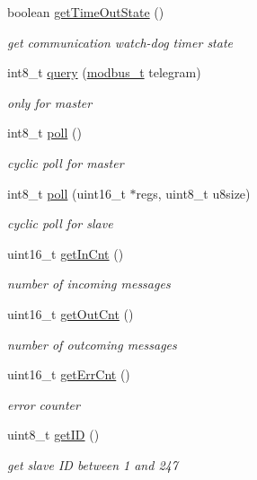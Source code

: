 \begin{DoxyCompactItemize}
boolean \hyperlink{group__loop_gaf6dd413191ed8a833022046873e0a063}{get\-Time\-Out\-State} ()
\begin{DoxyCompactList}\small\item\em get communication watch-\/dog timer state \end{DoxyCompactList}\item 
int8\-\_\-t \hyperlink{group__loop_ga19398cabed57b6d085d014af6c149f54}{query} (\hyperlink{structmodbus__t}{modbus\-\_\-t} telegram)
\begin{DoxyCompactList}\small\item\em only for master \end{DoxyCompactList}\item 
int8\-\_\-t \hyperlink{group__loop_ga53bde78490c1cd8e3c070a676bdcfb0d}{poll} ()
\begin{DoxyCompactList}\small\item\em cyclic poll for master \end{DoxyCompactList}\item 
int8\-\_\-t \hyperlink{group__loop_gab3ef20562fc8cee14fc85f7e276890b5}{poll} (uint16\-\_\-t $\ast$regs, uint8\-\_\-t u8size)
\begin{DoxyCompactList}\small\item\em cyclic poll for slave \end{DoxyCompactList}\item 
uint16\-\_\-t \hyperlink{group__buffer_ga4fa6ede8df85b7cc70b1282b9547378a}{get\-In\-Cnt} ()
\begin{DoxyCompactList}\small\item\em number of incoming messages \end{DoxyCompactList}\item 
uint16\-\_\-t \hyperlink{group__buffer_ga6f831ecaf3678c27dafb663a28bf81f0}{get\-Out\-Cnt} ()
\begin{DoxyCompactList}\small\item\em number of outcoming messages \end{DoxyCompactList}\item 
uint16\-\_\-t \hyperlink{group__buffer_ga6883c7f3ff12f084ed56d559d4e06ed0}{get\-Err\-Cnt} ()
\begin{DoxyCompactList}\small\item\em error counter \end{DoxyCompactList}\item 
uint8\-\_\-t \hyperlink{group__setup_ga6449894306ff8cc5d4caff09b1b0d1ce}{get\-I\-D} ()
\begin{DoxyCompactList}\small\item\em get slave I\-D between 1 and 247 \end{DoxyCompactList}\item 

\end{DoxyCompactItemize}
